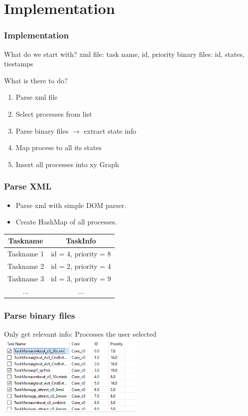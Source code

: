 \documentclass{beamer}
\begin{document}
\section{Implementation}
\begin{frame}
	\frametitle{Implementation}
	\begin{block}{What do we start with?}
		xml file: task name, id, priority
		binary files: id, states, tiestamps
	\end{block}
\end{frame}

\begin{frame}
	\begin{block}{What is there to do?}
		\begin{enumerate}
			\item Parse xml file
			\item Select processes from list
			\item Parse binary files $\rightarrow$ extract state info
			\item Map process to all its states
			\item Insert all processes into xy Graph
		\end{enumerate} 
	\end{block}
\end{frame}

\begin{frame}
	\frametitle{Parse XML}
	\begin{itemize}
		\item Parse xml with simple DOM parser.\\
		\item Create HashMap of all processes.\\ 
	\end{itemize}
	
	\begin{tabular}{|c|c|}
		\hline 
		\textbf{Taskname} & \textbf{TaskInfo} \\ 
		\hline 
		Taskname 1 & id = 4, priority = 8 \\ 
		\hline 
		Taskname 2 & id = 2, priority = 4 \\ 
		\hline 
		Taskname 3 & id = 3, priority = 9  \\ 
		\hline 
		...    & ...  \\ 
		\hline 
	\end{tabular} 
\end{frame}

\begin{frame}
	\frametitle{Parse binary files}
	Only get relevant info: Processes the user selected
	\includegraphics[width = 7cm]{table.png}
\end{frame}
\end{document}
